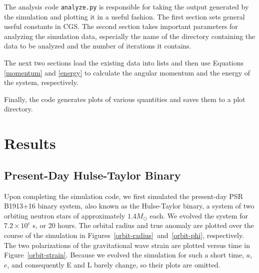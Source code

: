\documentclass[preprint2]{aastex}
\begin{document}
The analysis code \texttt{analyze.py} is responsible for taking the output generated by the simulation and plotting it in a useful fashion. The first section sets general useful constants in CGS. The second section takes important parameters for analyzing the simulation data, especially the name of the directory containing the data to be analyzed and the number of iterations it contains.

The next two sections load the existing data into lists and then use Equations \eqref{momentum} and \eqref{energy} to calculate the angular momentum and the energy of the system, respectively.

Finally, the code generates plots of various quantities and saves them to a plot directory.

\section{Results}

\subsection{Present-Day Hulse-Taylor Binary}

Upon completing the simulation code, we first simulated the present-day PSR B1913+16 binary system, also known as the Hulse-Taylor binary, a system of two orbiting neutron stars of approximately \(1.4 M_\odot\) each. We evolved the system for \(7.2 \times 10^e\) s, or 20 hours. The orbital radius and true anomaly are plotted over the course of the simulation in Figures~\ref{orbit-radius}~and~\ref{orbit-phi}, respectively. The two polarizations of the gravitational wave strain are plotted versus time in Figure~\ref{orbit-strain}. Because we evolved the simulation for such a short time, \(a\), \(e\), and consequently E and L barely change, so their plots are omitted.
\end{document}
